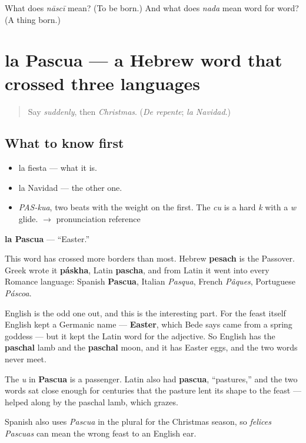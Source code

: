 \begin{tcolorbox}[breakable,colback=teal!4,colframe=teal!35!black,title={Before you move on}]
What does \emph{nāscī} mean? (To be born.) And what does \emph{nada} mean word for word? (A thing born.)
\end{tcolorbox}
\section[la Pascua]{la Pascua — a Hebrew word that crossed three languages}

\label{lesson:ES-C357-pascua}



\begin{quote}
Say \emph{suddenly}, then \emph{Christmas}. (\emph{De repente}; \emph{la Navidad}.)
\end{quote}

\subsection*{What to know first}
\begin{itemize}
\raggedright
  \item la fiesta — what it is.
  \item la Navidad — the other one.
\end{itemize}

\begin{sounds}
\begin{itemize}
\raggedright
  \item \emph{PAS-kua}, two beats with the weight on the first. The \emph{cu} is a hard \emph{k} with a \emph{w} glide. $\to$ pronunciation reference
\end{itemize}
\end{sounds}

\begin{cousinweb}
\textbf{la Pascua} — \textquotedblleft{}Easter.\textquotedblright{}

This word has crossed more borders than most. Hebrew \textbf{pesach} is the Passover. Greek wrote it \textbf{páskha}, Latin \textbf{pascha}, and from Latin it went into every Romance language: Spanish \textbf{Pascua}, Italian \emph{Pasqua}, French \emph{Pâques}, Portuguese \emph{Páscoa}.

English is the odd one out, and this is the interesting part. For the feast itself English kept a Germanic name — \textbf{Easter}, which Bede says came from a spring goddess — but it kept the Latin word for the adjective. So English has the \textbf{paschal} lamb and the \textbf{paschal} moon, and it has Easter eggs, and the two words never meet.

The \emph{u} in \textbf{Pascua} is a passenger. Latin also had \textbf{pascua}, \textquotedblleft{}pastures,\textquotedblright{} and the two words sat close enough for centuries that the pasture lent its shape to the feast — helped along by the paschal lamb, which grazes.

Spanish also uses \emph{Pascua} in the plural for the Christmas season, so \emph{felices Pascuas} can mean the wrong feast to an English ear.
\end{cousinweb}

